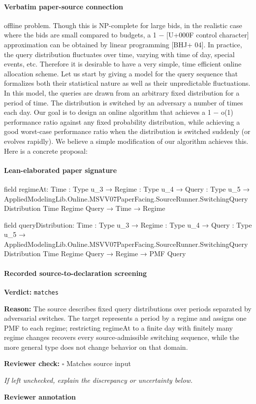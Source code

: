 \documentclass[10pt]{article}
\newcommand{\reviewerbox}{%
  \par\noindent\fbox{\parbox{0.96\linewidth}{\rule{0pt}{0.38in}}}\par
}
\newcommand{\reviewmatch}[1]{%
  \par\noindent\textbf{Reviewer check:} $\square$\; #1\par
  \noindent\emph{If left unchecked, explain the discrepancy or uncertainty below.}\par
}
\begin{document}
\paragraph{Verbatim paper-source connection}
\begin{ReviewVerbatim}
offline problem. Though this is NP-complete for large bids, in the realistic case where the bids
are small compared to budgets, a 1 − [U+000F control character] approximation can be obtained by linear programming
[BHJ+ 04]. In practice, the query distribution fluctuates over time, varying with time of day,
special events, etc. Therefore it is desirable to have a very simple, time efficient online allocation
scheme.
Let us start by giving a model for the query sequence that formalizes both their statistical
nature as well as their unpredictable fluctuations. In this model, the queries are drawn from an
arbitrary fixed distribution for a period of time. The distribution is switched by an adversary
a number of times each day. Our goal is to design an online algorithm that achieves a 1 − o(1)
performance ratio against any fixed probability distribution, while achieving a good worst-case
performance ratio when the distribution is switched suddenly (or evolves rapidly).
We believe a simple modification of our algorithm achieves this. Here is a concrete proposal:
\end{ReviewVerbatim}



\paragraph{Lean-elaborated paper signature}
\begin{ReviewVerbatim}
field regimeAt:
{Time : Type u_3} →
  {Regime : Type u_4} →
    {Query : Type u_5} →
      AppliedModelingLib.Online.MSVV07PaperFacing.SourceRunner.SwitchingQueryDistribution Time Regime Query →
        Time → Regime

field queryDistribution:
{Time : Type u_3} →
  {Regime : Type u_4} →
    {Query : Type u_5} →
      AppliedModelingLib.Online.MSVV07PaperFacing.SourceRunner.SwitchingQueryDistribution Time Regime Query →
        Regime → PMF Query
\end{ReviewVerbatim}


\paragraph{Recorded source-to-declaration screening}
\textbf{Verdict:} \texttt{matches}
\\
{\raggedright
\textbf{Reason:} The source describes fixed query distributions over periods separated by adversarial switches.\allowbreak{} The target represents a period by a regime and assigns one PMF to each regime;\allowbreak{} restricting regimeAt to a finite day with finitely many regime changes recovers every source-\allowbreak{}admissible switching sequence, while the more general type does not change behavior on that domain.\allowbreak{}
\par}
\reviewmatch{Matches source input}
\noindent\textbf{Reviewer annotation}\par
\reviewerbox
\clearpage
\hypertarget{paper-prerequisite-9bd0c7beac0b1526}{}
\end{document}

